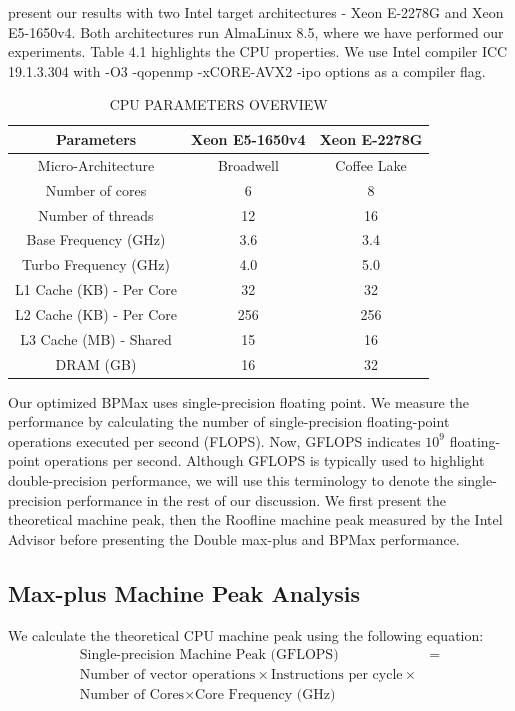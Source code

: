  present our results with two Intel target architectures - Xeon E-2278G and Xeon E5-1650v4. Both architectures run AlmaLinux 8.5, where we have performed our experiments. Table 4.1 highlights the CPU properties. We use Intel compiler ICC 19.1.3.304 with -O3  -qopenmp -xCORE-AVX2 -ipo options as a compiler flag.

\begin{table}[htbp]
\caption{\uppercase{CPU Parameters Overview}}
\label{tab:cpu parameters}
\begin{center}
\begin{tabular}{|c||c|c|}
\hline
 Parameters & Xeon E5-1650v4  & Xeon E-2278G \\
\hline
\hline
Micro-Architecture & Broadwell  & Coffee Lake \\
\hline
Number of cores & 6 & 8  \\
Number of threads & 12 & 16  \\
\hline
Base Frequency (GHz) & 3.6  & 3.4  \\
Turbo Frequency (GHz) & 4.0 & 5.0   \\
\hline
L1 Cache (KB) - Per Core  & 32 & 32  \\
L2 Cache (KB) - Per Core &  256  & 256 \\
L3 Cache (MB) - Shared & 15 & 16 \\
DRAM (GB) & 16 & 32 \\
\hline
\end{tabular}
\end{center}
\end{table}


Our optimized BPMax uses single-precision floating point. We measure the performance by calculating the number of single-precision floating-point operations executed per second (FLOPS). Now, GFLOPS indicates $10^9$ floating-point operations per second. Although GFLOPS is typically used to highlight double-precision performance, we will use this terminology to denote the single-precision performance in the rest of our discussion. We first present the theoretical machine peak, then the Roofline machine peak measured by the Intel Advisor before presenting the Double max-plus and BPMax performance.

\subsection{Max-plus Machine Peak Analysis}
We calculate the theoretical CPU machine peak using the following equation:
\begin{equation}\label{eqn:machine_peak_eqn}
\begin{split}
\text{Single-precision Machine Peak (GFLOPS)} &= \\
\text{Number of vector operations} \times \text {Instructions per cycle} \times \\
\text{Number of Cores} \times \text{Core Frequency (GHz)} \\
\end{split}
\end{equation}


